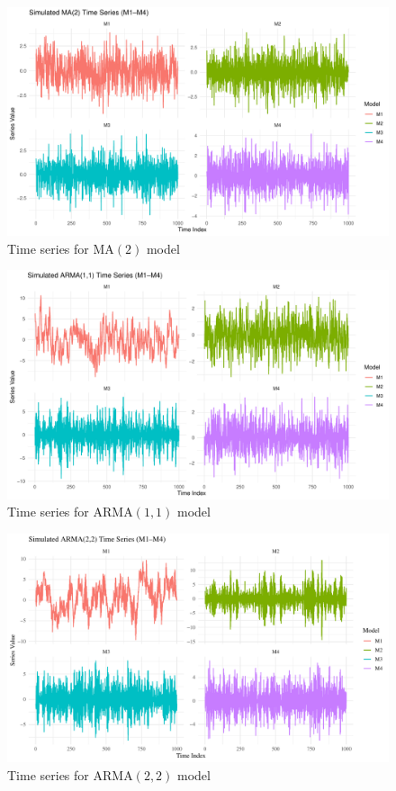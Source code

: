 \documentclass[12pt,a4paper]{article}
\begin{document}
\begin{figure}[H]
	\includegraphics[width=0.9 \textwidth]{ma2_time_series_plot}
	\caption{Time series for $\mathrm{MA}(2)$ model}
	\label{fig:TS MA(2)}
\end{figure}	

\begin{figure}[H]
	\includegraphics[width=0.9 \textwidth]{arma11_time_series_plot}
	\caption{Time series for $\mathrm{ARMA}(1,1)$ model}
	\label{fig:TS ARMA(11)}
\end{figure}	

\begin{figure}[H]
	\includegraphics[width=0.9 \textwidth]{arma22_time_series_plot}
	\caption{Time series for $\mathrm{ARMA}(2,2)$ model}
	\label{fig:TS ARMA(22)}
\end{figure}	
\end{document}

